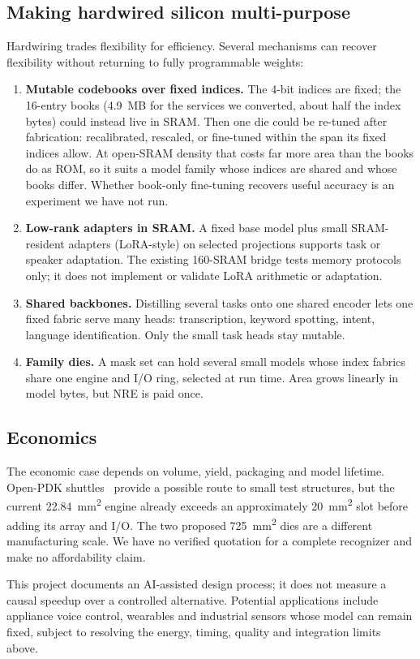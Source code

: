 \subsection{Making hardwired silicon multi-purpose}
Hardwiring trades flexibility for efficiency. Several mechanisms can recover flexibility without returning to fully programmable weights:
\begin{enumerate}
\item \textbf{Mutable codebooks over fixed indices.} The 4-bit indices are fixed; the 16-entry books (\SI{4.9}{MB} for the services we converted, about half the index bytes) could instead live in SRAM. Then one die could be re-tuned after fabrication: recalibrated, rescaled, or fine-tuned within the span its fixed indices allow. At open-SRAM density that costs far more area than the books do as ROM, so it suits a model family whose indices are shared and whose books differ. Whether book-only fine-tuning recovers useful accuracy is an experiment we have not run.
\item \textbf{Low-rank adapters in SRAM.} A fixed base model plus small SRAM-resident adapters (LoRA-style) on selected projections supports task or speaker adaptation. The existing 160-SRAM bridge tests memory protocols only; it does not implement or validate LoRA arithmetic or adaptation.
\item \textbf{Shared backbones.} Distilling several tasks onto one shared encoder lets one fixed fabric serve many heads: transcription, keyword spotting, intent, language identification. Only the small task heads stay mutable.
\item \textbf{Family dies.} A mask set can hold several small models whose index fabrics share one engine and I/O ring, selected at run time. Area grows linearly in model bytes, but NRE is paid once.
\end{enumerate}

\subsection{Economics}
The economic case depends on volume, yield, packaging and model lifetime. Open-PDK shuttles~\cite{waferspace} provide a possible route to small test structures, but the current \SI{22.84}{mm^2} engine already exceeds an approximately \SI{20}{mm^2} slot before adding its array and I/O. The two proposed \SI{725}{mm^2} dies are a different manufacturing scale. We have no verified quotation for a complete recognizer and make no affordability claim.

This project documents an AI-assisted design process; it does not measure a causal speedup over a controlled alternative. Potential applications include appliance voice control, wearables and industrial sensors whose model can remain fixed, subject to resolving the energy, timing, quality and integration limits above.
